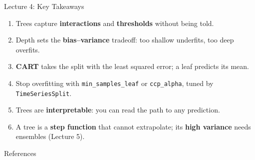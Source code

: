 \documentclass[aspectratio=169, 11pt]{beamer}
\begin{document}
\begin{frame}{Lecture 4: Key Takeaways}
  \begin{keybox}
    {\small
    \begin{enumerate}
      \item Trees capture \textbf{interactions} and \textbf{thresholds} without being told.
      \item Depth sets the \textbf{bias--variance} tradeoff: too shallow underfits, too deep
            overfits.
      \item \textbf{CART} takes the split with the least squared error; a leaf predicts its mean.
      \item Stop overfitting with \texttt{min\_samples\_leaf} or \texttt{ccp\_alpha}, tuned by
            \texttt{TimeSeriesSplit}.
      \item Trees are \textbf{interpretable}: you can read the path to any prediction.
      \item A tree is a \textbf{step function} that cannot extrapolate; its \textbf{high
            variance} needs ensembles (Lecture 5).
    \end{enumerate}
    }
  \end{keybox}
\end{frame}

\begin{frame}[allowframebreaks]{References}
  \printbibliography[heading=none]
\end{frame}

\end{document}
